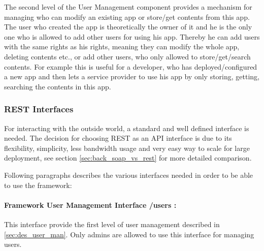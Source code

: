 The second level of the User Management component provides a mechanism for managing who can modify an existing app or store/get contents from this app. The user who created the app is theoretically the owner of it and he is the only one who is allowed to add other users for using his app. Thereby he can add users with the same rights as his rights, meaning they can modify the whole app, deleting contents etc., or add other users, who only allowed to store/get/search contents. For example this is useful for a developer, who has deployed/configured a new app and then lets a service provider to use his app by only storing, getting, searching the contents in this app. 

\subsubsection{REST Interfaces} For interacting with the outside world, a standard and well defined interface is needed. The decision for choosing REST as an API interface is due to its flexibility, simplicity, less bandwidth usage and very easy way to scale for large deployment, see section \ref{sec:back_soap_vs_rest} for more detailed comparison.

Following paragraphs describes the various interfaces needed in order to be able to use the framework:

\paragraph{Framework User Management Interface /users :} This interface provide the first level of user management described in \ref{sec:des_user_man}. Only admins are allowed to use this interface for managing users.


